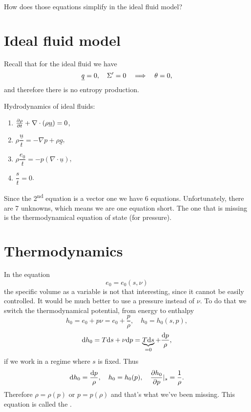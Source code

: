 \documentclass[11pt,oneside]{book}
\renewcommand{\vec}[1]{\underline{#1}}
\theoremstyle{definition} %
\theoremstyle{plain} %
\theoremstyle{remark} %
\theoremstyle{underline}
\begin{document}
  How does those equations simplify in the ideal fluid model?

  \section{Ideal fluid model}

  Recall that for the ideal fluid we have
  \begin{displaymath}
    \vec q = 0, \quad \Sigma' = 0 \qLRa \theta = 0,
  \end{displaymath}
  and therefore there is no entropy production.

  Hydrodynamics of ideal fluids:
  \begin{enumerate}
    \item $\ptf{\rho}{t} + \nabla \cdot (\rho \vec u) = 0$,
    \item $\rho \dfrac{\vec u}{t} = - \nabla p + \rho \vec g$,
    \item $ \rho \dfrac{e_0}{t} = - p(\nabla \cdot \vec u)$,
    \item $\dfrac{s}{t} = 0$.
  \end{enumerate}
  Since the 2\textsuperscript{nd} equation is a vector one we have $6$ equations. 
  Unfortunately, there are 7 unknowns, which means we are one equation short.
  The one that is missing is the thermodynamical equation of state (for pressure).

  \section{Thermodynamics}
  In the equation
  \begin{displaymath}
    e_0 = e_0(s , \nu)
  \end{displaymath}
  the specific volume as a variable is not that interesting, since it cannot be easily controlled. 
  It would be much better to use a pressure instead of $\nu$. 
  To do that we switch the thermodynamical potential, from energy to enthalpy
  \begin{displaymath}
    h_0 = e_0 + p \nu = e_0 + \frac{p}{\rho}, \quad h_0 = h_0(s, p), 
  \end{displaymath}
  \begin{displaymath}
    \mathrm{d} h_0 = T \mathrm{d} s + \nu \mathrm{d} p = \underbrace{T\mathrm{d} s}_{ = 0} + \frac{\mathrm{d} p}{\rho},
  \end{displaymath}
  if we work in a regime where $s$ is fixed.
  Thus 
  \begin{displaymath}
    \mathrm{d} h_0 = \frac{\mathrm{d} p}{\rho}, \quad h_0 = h_0(p),\quad \frac{\partial h_0}{\partial p}|_s = \frac{1}{\rho}.
  \end{displaymath}
  Therefore $\rho = \rho(p)$ or $p = p(\rho)$ and that's what we've been missing.
  This equation is called the .
  
\end{document}
